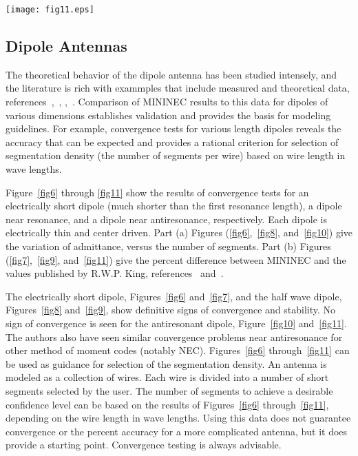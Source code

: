 \documentclass[12pt]{article}
\begin{document}
\begin{sidewaysfigure}[htb]
\centerline{\texttt{[image: fig11.eps]}}
\caption{Convergence test for an antiresonant dipole showing the percent
difference in admittance between MININEC and R. W. P. King
(references~\cite{r8} and~\cite{r9}) (Part b)}
\label{fig11}
\end{sidewaysfigure}
\afterpage\clearpage

\subsection{Dipole Antennas}
The theoretical behavior of the dipole antenna has been studied
intensely, and the literature is rich with exammples that include
measured and theoretical data, references~\cite{r8},~\cite{r9},
\cite{r15},~\cite{r16}. Comparison of MININEC results to this data for
dipoles of various dimensions establishes validation and provides the
basis for modeling guidelines. For example, convergence tests for
various length dipoles reveals the accuracy that can be expected and
provides a rational criterion for selection of segmentation density (the
number of segments per wire) based on wire length in wave lengths.

Figure~\ref{fig6} through \ref{fig11} show the results of convergence
tests for an electrically short dipole (much shorter than the first
resonance length), a dipole near resonance, and a dipole near
antiresonance, respectively. Each dipole is electrically thin and center
driven. Part (a) Figures (\ref{fig6},~\ref{fig8}, and~\ref{fig10}) give
the variation of admittance, versus the number of segments. Part (b)
Figures (\ref{fig7},~\ref{fig9}, and~\ref{fig11}) give the percent
difference between MININEC and the values published by R.W.P. King,
references~\cite{r8} and~\cite{r9}.

The electrically short dipole, Figures~\ref{fig6} and~\ref{fig7}, and
the half wave dipole, Figures~\ref{fig8} and~\ref{fig9}, show definitive
signs of convergence and stability. No sign of convergence is seen for
the antiresonant dipole, Figure~\ref{fig10} and~\ref{fig11}. The authors
also have seen similar convergence problems near antiresonance for other
method of moment codes (notably NEC). Figures~\ref{fig6}
through~\ref{fig11} can be used as guidance for selection of the
segmentation density. An antenna is modeled as a collection of wires.
Each wire is divided into a number of short segments selected by the
user. The number of segments to achieve a desirable confidence level can
be based on the results of Figures~\ref{fig6} through~\ref{fig11},
depending on the wire length in wave lengths. Using this data does not
guarantee convergence or the percent accuracy for a more complicated
antenna, but it does provide a starting point. Convergence testing is
always advisable.
\end{document}
